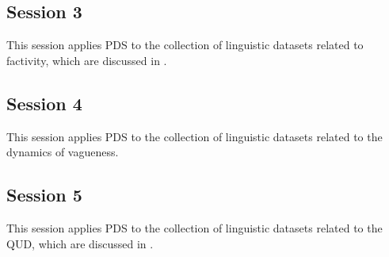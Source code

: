 \documentclass[nobib,nohyper]{tufte-handout}
\begin{document}
\subsection{Session 3}

This session applies PDS to the collection of linguistic datasets related to factivity, which are discussed in \cite{grove_factivity_2024}.

\subsection{Session 4}

This session applies PDS to the collection of linguistic datasets related to the dynamics of vagueness.

\subsection{Session 5}

This session applies PDS to the collection of linguistic datasets related to the QUD, which are discussed in \cite{grove_modeling_2025}.

\printbibliography
\end{document}
